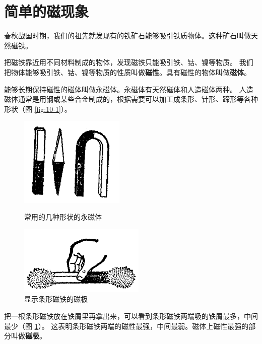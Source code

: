 \section{简单的磁现象}\label{sec:10-1}

春秋战国时期，我们的祖先就发现有的铁矿石能够吸引铁质物体。这种矿石叫做天然磁铁。

把磁铁靠近用不同材料制成的物体，发现磁铁只能吸引铁、钴、镍等物质。
我们把物体能够吸引铁、钴、镍等物质的性质叫做\textbf{磁性}。具有磁性的物体叫做\textbf{磁体}。

能够长期保持磁性的磁体叫做永磁体。永磁体有天然磁体和人造磁体两种。
人造磁体通常是用钢或某些合金制成的，根据需要可以加工成条形、针形、蹄形等各种形状（图 \ref{fig:10-1}）。

\begin{figure}[htbp]
    \centering
    \begin{minipage}{7cm}
    \centering
    \includegraphics[width=5cm]{../pic/czwl2-ch10-1}
    \caption{常用的几种形状的永磁体}\label{fig:10-1}
    \end{minipage}
    \qquad
    \begin{minipage}{7cm}
    \centering
    \includegraphics[width=6cm]{../pic/czwl2-ch10-2}
    \caption{显示条形磁铁的磁极}\label{fig:10-2}
    \end{minipage}
\end{figure}

把一根条形磁铁放在铁屑里再拿出来，可以看到条形磁铁两端吸的铁屑最多，中间最少（图 \ref{fig:10-2}）。
这表明条形磁铁两端的磁性最强，中间最弱。磁体上磁性最强的部分叫做\textbf{磁极}。


